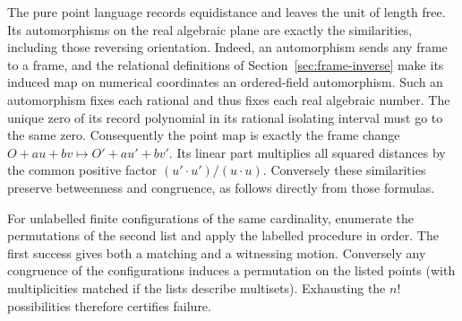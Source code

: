 The pure point language records equidistance and leaves the unit of
length free. Its automorphisms on the real algebraic plane are exactly
the similarities, including those reversing orientation. Indeed, an
automorphism sends any frame to a frame, and the relational definitions
of Section~\ref{sec:frame-inverse} make its induced map on numerical
coordinates an ordered-field automorphism. Such an automorphism fixes
each rational and thus fixes each real algebraic number. The unique
zero of its record polynomial in its rational isolating interval
must go to the same zero. Consequently the point map is exactly the
frame change $O+au+bv\mapsto O'+au'+bv'$. Its linear part multiplies
all squared distances by the common positive factor
$(u'\cdot u')/(u\cdot u)$. Conversely these similarities preserve
betweenness and congruence, as follows directly from those formulas.

For unlabelled finite configurations of the same cardinality, enumerate the
permutations of the second list and apply the labelled procedure in order.
The first success gives both a matching and a witnessing motion. Conversely
any congruence of the configurations induces a permutation on the listed
points (with multiplicities matched if the lists describe multisets).
Exhausting the $n!$ possibilities therefore certifies failure.
